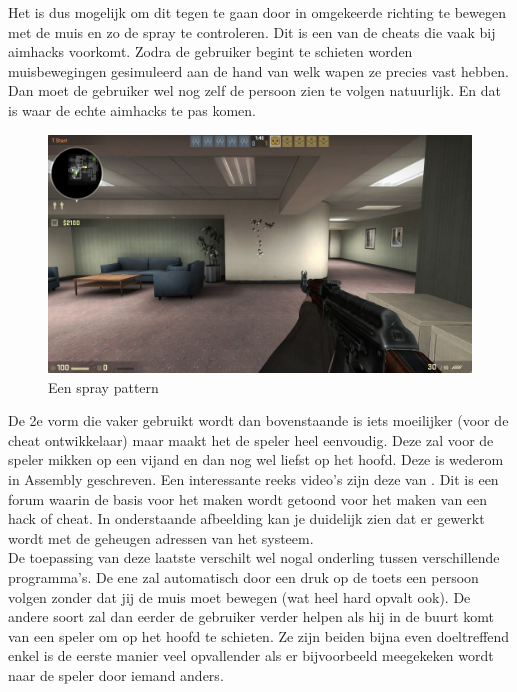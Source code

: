 \documentclass[pdftex,a4paper,12pt,twoside]{report}
\begin{document}
Het is dus mogelijk om dit tegen te gaan door in omgekeerde richting te bewegen met de muis en zo de spray te controleren. Dit is een van de \gls{cheat}s die vaak bij \gls{aim}hacks voorkomt. Zodra de gebruiker begint te schieten worden muisbewegingen gesimuleerd aan de hand van welk wapen ze precies vast hebben. Dan moet de gebruiker wel nog zelf de persoon zien te volgen natuurlijk. En dat is waar de echte \gls{aim}hacks te pas komen.

\begin{figure}[H]
\centering
\includegraphics[width=15cm]{img/spraypattern-example}
\caption{Een spray pattern}
\end{figure}

De 2e vorm die vaker gebruikt wordt dan bovenstaande is iets moeilijker (voor de cheat ontwikkelaar) maar maakt het de speler heel eenvoudig. Deze zal voor de speler mikken op een vijand en dan nog wel liefst op het hoofd. Deze is wederom in Assembly geschreven. Een interessante reeks video's zijn deze van \cite{basicaimbottutorial}. Dit is een forum waarin de basis voor het maken wordt getoond voor het maken van een hack of \gls{cheat}. In onderstaande afbeelding kan je duidelijk zien dat er gewerkt wordt met de geheugen adressen van het systeem. 
\\

De toepassing van deze laatste verschilt wel nogal onderling tussen verschillende programma's. De ene zal automatisch door een druk op de toets een persoon volgen zonder dat jij de muis moet bewegen (wat heel hard opvalt ook). De andere soort zal dan eerder de gebruiker verder helpen als hij in de buurt komt van een speler om op het hoofd te schieten. Ze zijn beiden bijna even doeltreffend enkel is de eerste manier veel opvallender als er bijvoorbeeld meegekeken wordt naar de speler door iemand anders.
\newpage
\end{document}
